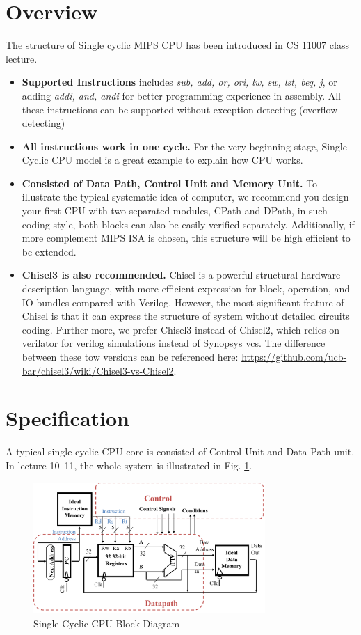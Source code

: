 \documentclass[a4paper]{article}
\begin{document}
\section{Overview} \label{overview}%
The structure of Single cyclic MIPS CPU has been introduced in CS 11007 class lecture.
\begin{itemize}
	\item{\textbf{Supported Instructions} includes \emph{sub, add, or, ori, lw, sw, lst, beq, j}, or adding \emph{addi, and, andi} for better programming experience in assembly. All these instructions can be supported without exception detecting (overflow detecting)}
    \item{\textbf{All instructions work in one cycle.} For the very beginning stage, Single Cyclic CPU model is a great example to explain how CPU works.}
    \item{\textbf{Consisted of Data Path, Control Unit and Memory Unit.} To illustrate the typical systematic idea of computer, we recommend you design your first CPU with two separated modules, CPath and DPath, in such coding style, both blocks can also be easily verified separately. Additionally, if more complement MIPS ISA is chosen, this structure will be high efficient to be extended.}
    \item{\textbf{Chisel3 is also recommended.} Chisel is a powerful structural hardware description language, with more efficient expression for block, operation, and IO bundles compared with Verilog. However, the most significant feature of Chisel is that it can express the structure of system without detailed circuits coding. Further more, we prefer Chisel3 instead of Chisel2, which relies on verilator for verilog simulations instead of Synopsys vcs. The difference between these tow versions can be referenced here: \url{https://github.com/ucb-bar/chisel3/wiki/Chisel3-vs-Chisel2}.}
\end{itemize}


\newpage
\section{Specification} \label{Specification}%
A typical single cyclic CPU core is consisted of Control Unit and Data Path unit. In lecture 10~11, the whole system is illustrated in Fig. \ref{fig:singleblock}. 
\begin{figure}[ht]
 \centering
 \includegraphics[height=5cm]{images/l1sys.pdf}
 \caption{Single Cyclic CPU Block Diagram}
 \label{fig:singleblock}
\end{figure}
\end{document}
